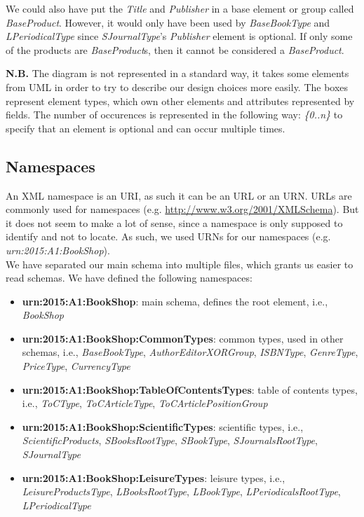 We could also have put the \emph{Title} and \emph{Publisher} in a base element
or group called \emph{BaseProduct}. However, it would only have been used by
\emph{BaseBookType} and \emph{LPeriodicalType} since \emph{SJournalType}'s
\emph{Publisher} element is optional. If only some of the products are
\emph{BaseProduct}s, then it cannot be considered a \emph{BaseProduct}.\\

\begin{framehint}
\textbf{N.B.} The diagram is not represented in a standard way, it takes some
elements from UML in order to try to describe our design choices more easily.
The boxes represent element types, which own other elements and attributes
represented by fields. The number of occurences is represented in the following
way: \emph{\{0..n\}} to specify that an element is optional and can occur multiple
times.
\end{framehint}

\subsection{Namespaces \small{
    \cite{cite:oracleNamespaces} \cite{cite:liquidNamespaces}
}}

An XML namespace is an URI, as such it can be an URL or an URN. URLs are
commonly used for namespaces (e.g.
\href{http://www.w3.org/2001/XMLSchema}{http://www.w3.org/2001/XMLSchema}). But
it does not seem to make a lot of sense, since a namespace is only supposed to
identify and not to locate. As such, we used URNs for our namespaces (e.g.
\emph{urn:2015:A1:BookShop}).\\
    
We have separated our main schema into multiple files, which grants us easier
to read schemas. We have defined the following namespaces:

\begin{itemize}
    \item \textbf{urn:2015:A1:BookShop}: main schema, defines the root element,
    i.e., \emph{BookShop}
    
    \item \textbf{urn:2015:A1:BookShop:CommonTypes}: common types, used in other
    schemas, i.e., \emph{BaseBookType}, \emph{AuthorEditorXORGroup},
    \emph{ISBNType}, \emph{GenreType}, \emph{PriceType}, \emph{CurrencyType}
    
    \item \textbf{urn:2015:A1:BookShop:TableOfContentsTypes}: table of contents
    types, i.e., \emph{ToCType}, \emph{ToCArticleType},
    \emph{ToCArticlePositionGroup}
    
    \item \textbf{urn:2015:A1:BookShop:ScientificTypes}: scientific types, i.e.,
    \emph{ScientificProducts}, \emph{SBooksRootType}, \emph{SBookType},
    \emph{SJournalsRootType}, \emph{SJournalType}
    
    \item \textbf{urn:2015:A1:BookShop:LeisureTypes}: leisure types, i.e.,
    \emph{LeisureProductsType}, \emph{LBooksRootType}, \emph{LBookType},
    \emph{LPeriodicalsRootType}, \emph{LPeriodicalType}
\end{itemize}
\

